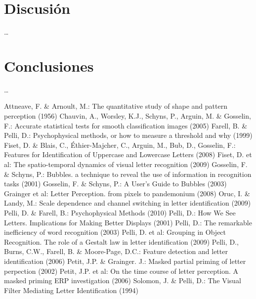 \documentclass[runningheads,a4paper]{llncs}
\begin{document}
\section{Discusi\'on}
\ldots

\section{Conclusiones}
\ldots


\newpage

\begin{thebibliography}{20}
  	Attneave, F. \& Arnoult, M.: The quantitative study of shape and pattern perception (1956)
  	Chauvin, A., Worsley, K.J., Schyns, P., Arguin, M. \& Gosselin, F.: Accurate statistical tests for smooth classification images (2005)
  		Farell, B. \& Pelli, D.: Psychophysical methods, or how to measure a threshold and why (1999)
  		Fiset, D. \& Blais, C., \'Ethier-Majcher, C., Arguin, M., Bub, D., Gosselin, F.: Features for Identification of Uppercase and Lowercase Letters (2008)
  		Fiset, D. et al: The spatio-temporal dynamics of visual letter recognition (2009)
  			Gosselin, F. \& Schyns, P.: Bubbles. a technique to reveal the use of information in recognition tasks (2001)
  		Gosselin, F. \& Schyns, P.: A User's Guide to Bubbles (2003)
  		Grainger et al: Letter Perception. from pixels to pandemonium (2008)
  		Oruc, I. \& Landy, M.: Scale dependence and channel switching in letter identification (2009)
  		Pelli, D. \& Farell, B.: Psychophysical Methods (2010)
  			Pelli, D.: How We See Letters. Implications for Making Better Displays (2001)
  		Pelli, D.: The remarkable inefficiency of word recognition (2003)
  		Pelli, D. et al: Grouping in Object Recognition. The role of a Gestalt law in letter identification (2009)
  		Pelli, D., Burns, C.W., Farell, B. \& Moore-Page, D.C.: Feature detection and letter identification (2006)
  	Petit, J.P. \& Grainger. J.: Masked partial priming of letter perpection (2002)
  		Petit, J.P. et al: On the time course of letter perception. A masked priming ERP investigation (2006)
  	Solomon, J. \& Pelli, D.: The Visual Filter Mediating Letter Identification (1994)


\end{thebibliography}
\end{document}
